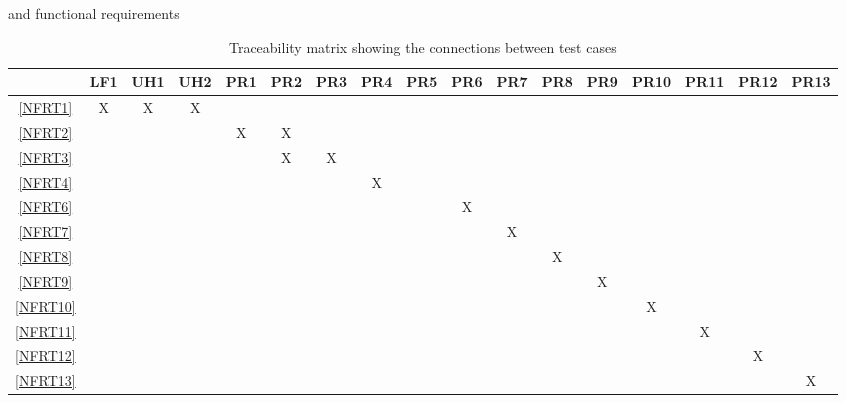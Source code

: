 \documentclass[12pt, titlepage]{article}
\begin{document}
\begin{landscape}
\begin{table}[h!]
{      and functional requirements}
    \label{tab:frt}
  \end{table}
  \begin{table}[h!]
    \centering
    \begin{tabular}{|c|c|c|c|c|c|c|c|c|c|c|c|c|c|c|c|c|} \hline
                & LF1 & UH1 & UH2 & PR1 & PR2 & PR3 & PR4 & PR5 & PR6 & PR7 & PR8 & PR9 & PR10 & PR11 & PR12 & PR13 \\ \hline
      \ref{NFRT1}  & X   & X   & X   &     &     &     &     &     &     &     &     &     &      &      &      &      \\ \hline
      \ref{NFRT2}  &     &     &     & X   & X   &     &     &     &     &     &     &     &      &      &      &      \\ \hline
      \ref{NFRT3}  &     &     &     &     & X   & X   &     &     &     &     &     &     &      &      &      &      \\ \hline
      \ref{NFRT4}  &     &     &     &     &     &     & X   &     &     &     &     &     &      &      &      &      \\ \hline
      \ref{NFRT6}  &     &     &     &     &     &     &     &     & X   &     &     &     &      &      &      &      \\ \hline
      \ref{NFRT7}  &     &     &     &     &     &     &     &     &     & X   &     &     &      &      &      &      \\ \hline
      \ref{NFRT8}  &     &     &     &     &     &     &     &     &     &     & X   &     &      &      &      &      \\ \hline
      \ref{NFRT9}  &     &     &     &     &     &     &     &     &     &     &     & X   &      &      &      &      \\ \hline
      \ref{NFRT10} &     &     &     &     &     &     &     &     &     &     &     &     & X    &      &      &      \\ \hline
      \ref{NFRT11} &     &     &     &     &     &     &     &     &     &     &     &     &      & X    &      &      \\ \hline
      \ref{NFRT12} &     &     &     &     &     &     &     &     &     &     &     &     &      &      & X    &      \\ \hline
      \ref{NFRT13} &     &     &     &     &     &     &     &     &     &     &     &     &      &      &      & X    \\ \hline
    \end{tabular}
    \caption{Traceability matrix showing the connections between test cases
}
\end{table}
\end{landscape}
\end{document}
